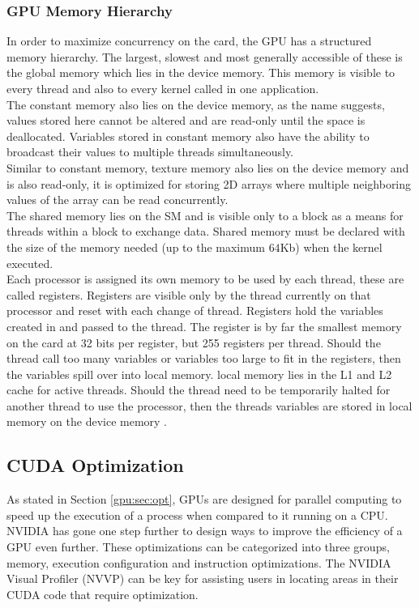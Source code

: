 \subsubsection{GPU Memory Hierarchy}\label{gpu:ssec:mem}
In order to maximize concurrency on the card, the GPU has a structured memory hierarchy. The largest, slowest and most generally accessible of these is the global memory which lies in the device memory. This memory is visible to every thread and also to every kernel called in one application. 
\\
The constant memory also lies on the device memory, as the name suggests, values stored here cannot be altered and are read-only until the space is deallocated. Variables stored in constant memory also have the ability to broadcast their values to multiple threads simultaneously.
\\
Similar to constant memory, texture memory also lies on the device memory and is also read-only, it is optimized for storing 2D arrays where multiple neighboring values of the array can be read concurrently.
\\
The shared memory lies on the SM and is visible only to a block as a means for threads within a block to exchange data. Shared memory must be declared with the size of the memory needed (up to the maximum $64$Kb) when the kernel executed.
\\
Each processor is assigned its own memory to be used by each thread, these are called registers. Registers are visible only by the thread currently on that processor and reset with each change of thread. Registers hold the variables created in and passed to the thread. The register is by far the smallest memory on the card at 32 bits per register, but 255 registers per thread. Should the thread call too many variables or variables too large to fit in the registers, then the variables spill over into local memory. local memory lies in the L1 and L2 cache for active threads. Should the thread need to be temporarily halted for another thread to use the processor, then the threads variables are stored in local memory on the device memory \citep{CUDA_DEVKIT}.
%
\subsection{CUDA Optimization}\label{gpu:sec:cop}
As stated in Section \ref{gpu:sec:opt}, GPUs are designed for parallel computing to speed up the execution of a process when compared to it running on a CPU. NVIDIA has gone one step further to design ways to improve the efficiency of a GPU even further. These optimizations can be categorized into three groups, memory, execution configuration and instruction optimizations. The NVIDIA Visual Profiler (NVVP) can be key for assisting users in locating areas in their CUDA code that require optimization.
